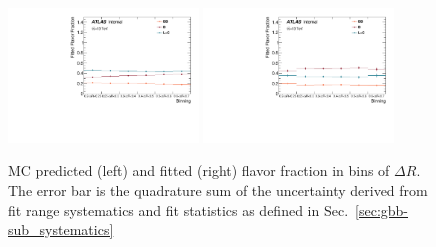 \begin{figure}[htbp]
  \centering
 \includegraphics[width=0.45\textwidth]{figures/gbb/Sub_Sd0_Fits/Canv_dR_FitFrac_Original.pdf}
 \includegraphics[width=0.45\textwidth]{figures/gbb/Sub_Sd0_Fits/Canv_dR_FitFrac_Corrected.pdf}

\caption{MC predicted (left) and fitted (right) flavor fraction in bins of $\Delta R$. The error bar is the quadrature sum of the uncertainty derived from fit range systematics and fit statistics as defined in Sec.~\ref{sec:gbb-sub_systematics}}
  \label{fig:dR-fitfrac}
\end{figure}

